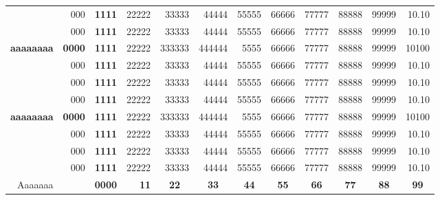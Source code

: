 \begin{landscape}
\begin{longtable}[htbp]
\begin{tabular}{rrrrrrrrrrrr}
          & 000   & \textbf{1111} & 22222 & 33333 & 44444 & 55555  & 66666 & 77777 & 88888 & 99999 & 10.10 \\
          & 000   & \textbf{1111} & 22222 & 33333 & 44444 & 55555  & 66666 & 77777 & 88888 & 99999 & 10.10 \\
    \textbf{aaaaaaaa} & \textbf{0000} & \textbf{1111} & 22222 & 333333 & 444444 & 5555  & 66666 & 77777 & 88888 & 99999 & 10100 \\
          & 000   & \textbf{1111} & 22222 & 33333 & 44444 & 55555  & 66666 & 77777 & 88888 & 99999 & 10.10 \\
          & 000   & \textbf{1111} & 22222 & 33333 & 44444 & 55555  & 66666 & 77777 & 88888 & 99999 & 10.10 \\
          & 000   & \textbf{1111} & 22222 & 33333 & 44444 & 55555  & 66666 & 77777 & 88888 & 99999 & 10.10 \\
    \textbf{aaaaaaaa} & \textbf{0000} & \textbf{1111} & 22222 & 333333 & 444444 & 5555  & 66666 & 77777 & 88888 & 99999 & 10100 \\
          & 000   & \textbf{1111} & 22222 & 33333 & 44444 & 55555  & 66666 & 77777 & 88888 & 99999 & 10.10 \\
          & 000   & \textbf{1111} & 22222 & 33333 & 44444 & 55555  & 66666 & 77777 & 88888 & 99999 & 10.10 \\
          & 000   & \textbf{1111} & 22222 & 33333 & 44444 & 55555  & 66666 & 77777 & 88888 & 99999 & 10.10 \\
    \midrule
    Aaaaaaa &    & \textbf{0000} & \textbf{11} & \multicolumn{1}{c}{\textbf{22}} & \multicolumn{1}{c}{\textbf{33}} & \multicolumn{1}{c}{\textbf{44}} & \multicolumn{1}{c}{\textbf{55}} & \multicolumn{1}{c}{\textbf{66}} & \multicolumn{1}{c}{\textbf{77}} & \multicolumn{1}{c}{\textbf{88}} & \multicolumn{1}{c}{\textbf{99}} \\
    \bottomrule
    \end{tabular}%
  \label{tab:addlabel}%
\end{longtable}
\end{landscape}
\twocolumn



